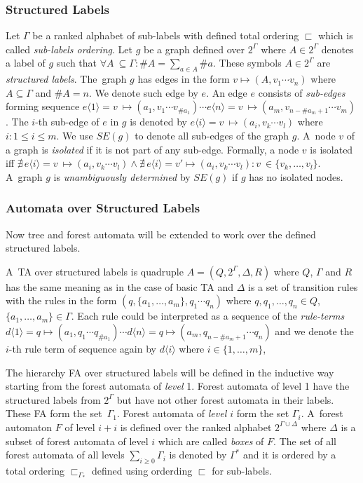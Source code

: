 \documentclass[a4paper, 12pt]{article}
\begin{document}
\subsubsection{Structured Labels}
\label{subsec:structlab}
Let $\Gamma$ be a ranked alphabet of sub-labels with defined total ordering $\sqsubset$ which is called \emph{sub-labels ordering}.
Let $g$ be a graph defined over $2^\Gamma$ where $A \in 2^\Gamma$ denotes a label of $g$
such that $\forall A~\subseteq \Gamma: \#A = \sum_{a\in A} \#a$.
These symbols $A \in 2^\Gamma$ are \emph{structured labels}.
The~graph $g$ has edges in the form $v \mapsto (A,v_1 \cdots v_n)$ where
$A \subseteq \Gamma$ and $\#A = n$.
We denote such edge by $e$.
An edge $e$ consists of \emph{sub-edges} forming sequence
$e\langle 1\rangle = v~\mapsto (a_1,v_1 \cdots v_{\#a_1}) \cdots e\langle n\rangle= v~\mapsto (a_m,v_{n-\#a_m+1} \cdots v_m)$.
The $i$-th sub-edge of $e$ in $g$ is denoted by $e\langle i\rangle = v~\mapsto (a_i,v_k \cdots v_l)$ where $i: 1 \leq i \leq m$.
We use $SE(g)$ to denote all sub-edges of the graph $g$.
A~node $v$ of a graph is \emph{isolated} if it is not part of any sub-edge.
Formally, a node $v$ is isolated
iff $\nexists\, e\langle i\rangle = v~\mapsto (a_i,v_k \cdots v_l) \wedge \nexists\, e\langle i\rangle = v' \mapsto (a_i,v_k \cdots v_l): v~\in \{v_k,\ldots, v_l\}$.
A~graph $g$ is \emph{unambiguously determined} by $SE(g)$ if $g$ has no isolated nodes.

\subsubsection{Automata over Structured Labels}
\label{subsec:hfa}

Now tree and forest automata will be extended to work over the defined structured labels.

A~TA over structured labels is quadruple $A=(Q,2^\Gamma, \Delta, R)$
where $Q$, $\Gamma$ and $R$ has the same meaning as in the case of basic TA and
	$\Delta$ is a set of transition rules with the rules in the form
		$(q,\{a_1,\ldots,a_m\},q_1 \cdots q_n)$
		where $q,q_1,\ldots,q_n \in Q$, $\{a_1,\ldots,a_m\} \in \Gamma$.
	Each rule could be interpreted as a sequence of the \emph{rule-terms}
	$d\langle 1\rangle = q \mapsto (a_1,q_1 \cdots q_{\#a_1}) \cdots d\langle n\rangle= q \mapsto (a_m,q_{n-\#a_m+1} \cdots q_n)$ and
	we denote the $i$-th rule term of sequence again by $d\langle i\rangle$ where $i \in \{1,\ldots,m\}$,

The hierarchy FA over structured labels will be defined in the inductive way
starting from the forest automata of \emph{level} 1.
Forest automata of level 1 have the structured labels from $2^\Gamma$ but
have not other forest automata in their labels.
These FA form the set~$\Gamma_1$.
Forest automata of \emph{level $i$} form the set $\Gamma_i$.
A~forest automaton $F$ of level $i+i$ is defined over the ranked alphabet $2^{\Gamma \cup \Delta}$
where $\Delta$ is a subset of forest automata of level $i$ which are called \emph{boxes} of $F$.
The set of all forest automata of all levels $\sum_{i \geq 0} \Gamma_i$ is denoted by $\Gamma^{*}$ and
it is ordered by a total ordering $\sqsubset_{\Gamma_*}$ defined using orderding $\sqsubset$ for sub-labels.
\end{document}
